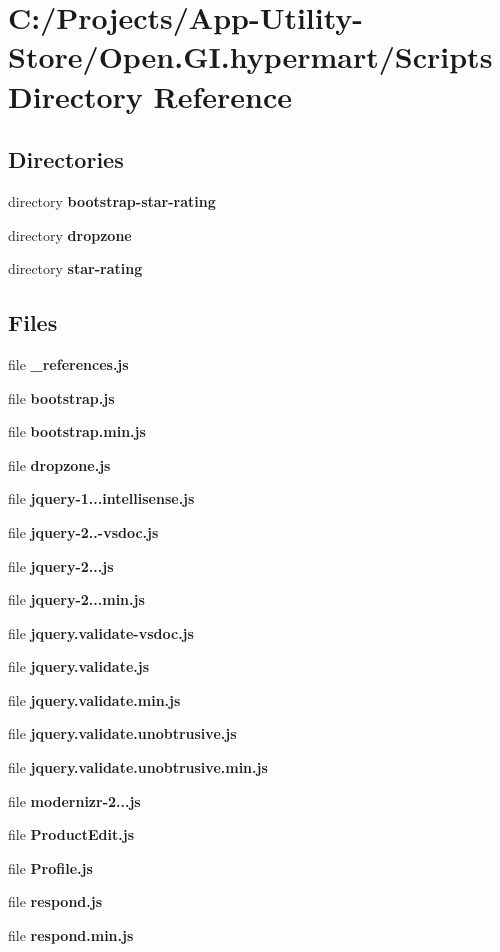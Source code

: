 \section{C\+:/\+Projects/\+App-\/\+Utility-\/\+Store/\+Open.G\+I.\+hypermart/\+Scripts Directory Reference}
\label{dir_6baca79b21f2a33a33d576862dc95c49}
\subsection*{Directories}
\begin{DoxyCompactItemize}
\item 
directory \textbf{ bootstrap-\/star-\/rating}
\item 
directory \textbf{ dropzone}
\item 
directory \textbf{ star-\/rating}
\end{DoxyCompactItemize}
\subsection*{Files}
\begin{DoxyCompactItemize}
\item 
file \textbf{ \+\_\+references.\+js}
\item 
file \textbf{ bootstrap.\+js}
\item 
file \textbf{ bootstrap.\+min.\+js}
\item 
file \textbf{ dropzone.\+js}
\item 
file \textbf{ jquery-\/1...\+intellisense.\+js}
\item 
file \textbf{ jquery-\/2..-\/vsdoc.\+js}
\item 
file \textbf{ jquery-\/2...\+js}
\item 
file \textbf{ jquery-\/2...\+min.\+js}
\item 
file \textbf{ jquery.\+validate-\/vsdoc.\+js}
\item 
file \textbf{ jquery.\+validate.\+js}
\item 
file \textbf{ jquery.\+validate.\+min.\+js}
\item 
file \textbf{ jquery.\+validate.\+unobtrusive.\+js}
\item 
file \textbf{ jquery.\+validate.\+unobtrusive.\+min.\+js}
\item 
file \textbf{ modernizr-\/2...\+js}
\item 
file \textbf{ Product\+Edit.\+js}
\item 
file \textbf{ Profile.\+js}
\item 
file \textbf{ respond.\+js}
\item 
file \textbf{ respond.\+min.\+js}
\end{DoxyCompactItemize}
